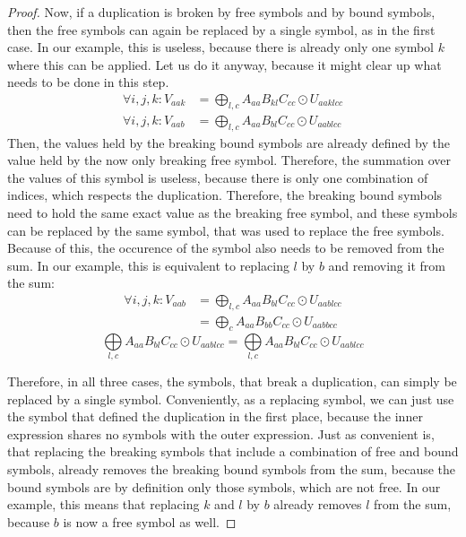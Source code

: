 \begin{proof}
    Now, if a duplication is broken by free symbols and by bound symbols,
    then the free symbols can again be replaced by a single symbol, as in the first case.
    In our example, this is useless, because there is already only one symbol $k$ where this can be applied.
    Let us do it anyway, because it might clear up what needs to be done in this step.
    \begin{align*}
        \forall i,j,k: V_{aak} & = \bigoplus\limits_{l,c} A_{aa} B_{kl} C_{cc} \odot U_{aaklcc} \\
        \forall i,j,k: V_{aab} & = \bigoplus\limits_{l,c} A_{aa} B_{bl} C_{cc} \odot U_{aablcc}
    \end{align*}
    Then, the values held by the breaking bound symbols are already defined by the value held by the now only breaking free symbol.
    Therefore, the summation over the values of this symbol is useless, because there is only one combination of indices, which respects the duplication.
    Therefore, the breaking bound symbols need to hold the same exact value as the breaking free symbol,
    and these symbols can be replaced by the same symbol, that was used to replace the free symbols.
    Because of this, the occurence of the symbol also needs to be removed from the sum.
    In our example, this is equivalent to replacing $l$ by $b$ and removing it from the sum:
    \begin{align*}
        \forall i,j,k: V_{aab} & = \bigoplus\limits_{l,c} A_{aa} B_{bl} C_{cc} \odot U_{aablcc} \\
                               & = \bigoplus\limits_{c} A_{aa} B_{bb} C_{cc} \odot U_{aabbcc}
    \end{align*}
    $$\bigoplus\limits_{l,c} A_{aa} B_{bl} C_{cc} \odot U_{aablcc} = \bigoplus\limits_{l,c} A_{aa} B_{bl} C_{cc} \odot U_{aablcc}$$

    Therefore, in all three cases, the symbols, that break a duplication, can simply be replaced by a single symbol.
    Conveniently, as a replacing symbol, we can just use the symbol that defined the duplication in the first place,
    because the inner expression shares no symbols with the outer expression.
    Just as convenient is, that replacing the breaking symbols that include a combination of free and bound symbols, already removes the breaking bound symbols from the sum,
    because the bound symbols are by definition only those symbols, which are not free.
    In our example, this means that replacing $k$ and $l$ by $b$ already removes $l$ from the sum, because $b$ is now a free symbol as well.


\end{proof}
